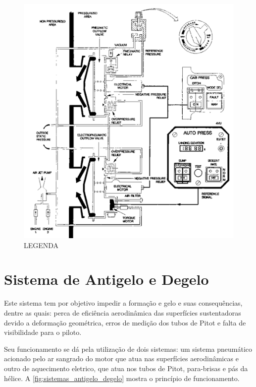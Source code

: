 \begin{figure}
\centering
\includegraphics{images/parte3/sistemas_pressurizacao.png}
\caption{LEGENDA}
\label{fig:sistemas_pressurizacao}
\end{figure}


\section{Sistema de Antigelo e Degelo}

Este sistema tem por objetivo impedir a formação e gelo e suas consequências, dentre as quais: perca de eficiência aerodinâmica das superfícies sustentadoras devido a deformação geométrica, erros de medição dos tubos de Pitot e falta de visibilidade para o piloto.

Seu funcionamento se dá pela utilização de dois sistemas: um sistema pneumático acionado pelo ar sangrado do motor que atua nas superfícies aerodinâmicas e outro de aquecimento eletrico, que atua nos tubos de Pitot, para-brisas e pás da hélice.
A \autoref{fig:sistemas_antigelo_degelo} mostra o princípio de funcionamento.

